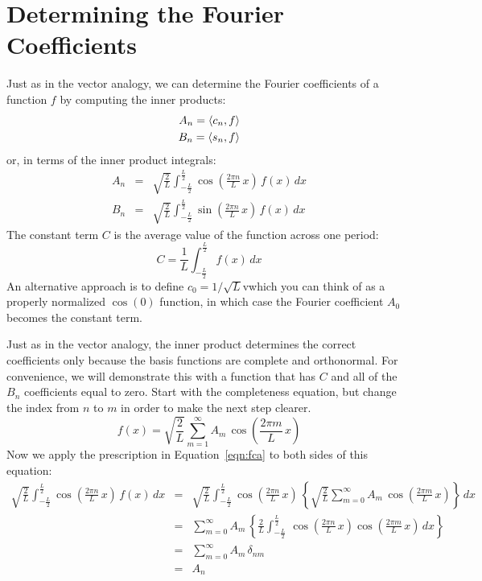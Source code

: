 \documentclass[12pt,oneside]{book}
\begin{document}
\section{Determining the Fourier Coefficients}
\label{sect:coeff}


Just as in the vector analogy, we can determine the Fourier coefficients of a function $f$ by computing the inner products:
\begin{eqnarray*}
A_n = \braket{c_n, f} \\
B_n = \braket{s_n, f} 
\end{eqnarray*}
or, in terms of the inner product integrals:
\begin{eqnarray}
A_n &=& \sqrt{\frac{2}{L}} \int_{-\frac{L}{2}}^{\frac{L}{2}} 
\cos\left(\frac{2\pi n}{L} \, x \right) \, f(x) \, dx \label{eqn:fca} \\
B_n &=& \sqrt{\frac{2}{L}} \int_{-\frac{L}{2}}^{\frac{L}{2}} \nonumber
\sin\left(\frac{2\pi n}{L} \, x \right) \, f(x) \, dx
\end{eqnarray}
The constant term $C$ is the average value of the function across one period:
\begin{equation*}
C = \frac{1}{L} \int_{-\frac{L}{2}}^{\frac{L}{2}} f(x) \, dx
\end{equation*}
An alternative approach is to define $c_0 = 1/\sqrt{L}$vwhich you can think of as a properly normalized $\cos(0)$ function, in which case the Fourier coefficient $A_0$ becomes the constant term.

Just as in the vector analogy, the inner product determines the correct coefficients only because the basis functions are complete and orthonormal.  For convenience, we will demonstrate this with a function that has $C$ and all of the $B_n$ coefficients equal to zero.  Start with the completeness equation, but change the index from $n$ to $m$ in order to make the next step clearer.  
\begin{displaymath}
f(x) = \sqrt{\frac{2}{L}} \sum_{m=1}^{\infty}  A_m \, \cos\left(\frac{2\pi m}{L} \, x \right)
\end{displaymath}
Now we apply the prescription in Equation~\ref{eqn:fca} to both sides of this equation:
\begin{eqnarray*}
\sqrt{\frac{2}{L}} \int_{-\frac{L}{2}}^{\frac{L}{2}} 
\cos\left(\frac{2\pi n}{L} \, x \right) \, f(x) \, dx  
&=& \sqrt{\frac{2}{L}} \int_{-\frac{L}{2}}^{\frac{L}{2}} 
\cos\left(\frac{2\pi n}{L} \, x \right) \,
\left\{
\sqrt{\frac{2}{L}} \sum_{m=0}^{\infty}  A_m \, \cos\left(\frac{2\pi m}{L} \, x \right) \right\}
 \, dx \\
&=& \sum_{m=0}^{\infty}  A_m \, \left\{ \frac{2}{L} 
\int_{-\frac{L}{2}}^{\frac{L}{2}} 
 \, \cos\left(\frac{2\pi n}{L} \, x \right) \cos\left(\frac{2\pi m}{L} \, x \right) \, dx \right\}\\
&=& \sum_{m=0}^{\infty}  A_m \, \delta_{nm} \\
&=& A_n
\end{eqnarray*}
\end{document}
